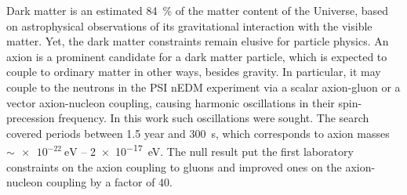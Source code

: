 Dark matter is an estimated \SI{84}{\percent} of the matter content of the Universe, based on astrophysical observations of its gravitational interaction with the visible matter.
Yet, the dark matter constraints remain elusive for particle physics.
An axion is a prominent candidate for a dark matter particle, which is expected to couple to ordinary matter in other ways, besides gravity.
In particular, it may couple to the neutrons in the PSI nEDM experiment via a scalar axion-gluon or a vector axion-nucleon coupling, causing harmonic oscillations in their spin-precession frequency.
In this work such oscillations were sought.
The search covered periods between \num{1.5} year and \SI{300}{\second}, which corresponds to axion masses $\sim \SI{e-22}{\electronvolt}$ -- \SI{2e-17}{\electronvolt}.
The null result put the first laboratory constraints on the axion coupling to gluons and improved ones on the axion-nucleon coupling by a factor of 40.

\enlargethispage{2\baselineskip}

\endgroup			

\vfill
